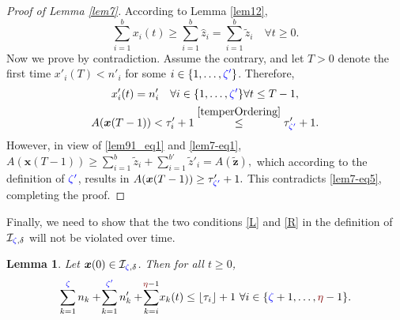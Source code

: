 \documentclass[10 pt,twocolumn,journal]{IEEEtran}
\DeclarePairedDelimiter{\floor}{\lfloor}{\rfloor}
\theoremstyle{plain}
\newtheorem{lemma}{Lemma}
\newcommand{\I}{\mathcal{I}}
\newcommand{\x}{\bm{x}}
\newcommand{\z}{\bm{z}}
\renewcommand{\r}{\tb{\zeta}}
\newcommand{\rr}{\tb{\zeta'}}
\newcommand{\s}{\tr{\eta}}
\renewcommand{\d}{{\delta}}
\newcommand{\tb}{\textcolor{blue}}
\newcommand{\tr}{\textcolor{Myred}}
\theoremstyle{definition}
\begin{document}
%
\begin{proof}[Proof of Lemma \ref{lem7}]
    According to Lemma \ref{lem12},
    \begin{equation} \label{lem91_eq1}
        \sum_{i=1}^b x_i(t) \geq \sum_{i=1}^b \hat{z}_i = \sum_{i=1}^b\tilde{z}_i \quad \forall t\geq 0.
    \end{equation}
    Now we prove by contradiction. 
    Assume the contrary, and let $T > 0$ denote the first time $x'_i(T) < n'_i$ for some $i\in\{1,\ldots, \rr\}$.
    Therefore, 
    \begin{gather}   
        x'_i(t) = n'_i\quad \forall i\in\{1,\ldots, \rr\}\forall t\leq T-1, \label{lem7-eq1} \\
        A(\x(T - 1)) < \tau'_i + 1 \overset{\eqref{temperOrdering}}{\leq} \tau'_{\rr} + 1. \label{lem7-eq5}
    \end{gather}
    However, in view of \eqref{lem91_eq1} and \eqref{lem7-eq1}, 
    $
         A(\x(T-1))
         \geq \sum_{i=1}^b\tilde{z}_i + \sum_{i=1}^{b'}\tilde{z}'_i 
         = A(\tilde{\z}),
    $
    which according to the definition of $\rr$, results in 
    $
         A(\x(T-1)) \geq \tau'_{\rr} + 1.
    $
    This contradicts \eqref{lem7-eq5}, completing the proof.
\end{proof}
%
Finally, we need to show that the two conditions \eqref{L} and \eqref{R} in the definition of $\I_{\r,\d}$ will not be violated over time.
%
\begin{lemma}   \label{lem13}
    Let $\x(0) \in \I_{\r,\d}$. 
    Then for all $t\geq 0$,
    \begin{equation*} %
        \sum_{k=1}^{\r} n_k +\! \sum_{k=1}^{\rr} n'_k +\! \sum_{k=i}^{\s-1}\! x_k(t) \leq \floor{\tau_i}+1\  \forall i\in\{\r+1,\ldots,\s-1\}.
    \end{equation*}    
\end{lemma}
\end{document}
